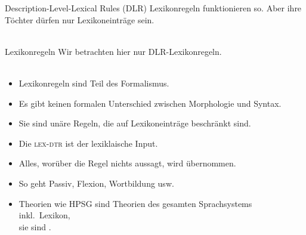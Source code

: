 \begin{frame}
  {Description-Level-Lexical Rules (DLR)}
  \onslide<+->
  \onslide<+->
  \alert{Lexikonregeln} funktionieren so. Aber \alert{ihre Töchter dürfen nur Lexikoneinträge sein}.\\
  \onslide<+->
  \Zeile
  \centering 
  \\
  \Halbzeile
  \onslide<+->
\end{frame}

\begin{frame}
  {Lexikonregeln}
  \onslide<+->
  \onslide<+->
  Wir betrachten hier nur DLR-Lexikonregeln.\\
  \\
  \Halbzeile
  \begin{itemize}[<+->]
    \item Lexikonregeln sind Teil des Formalismus.
    \item Es gibt keinen formalen Unterschied zwischen Morphologie und Syntax.
    \item Sie sind unäre Regeln, die auf Lexikoneinträge beschränkt sind.
    \item Die \textsc{lex-dtr} ist der lexiklaische Input.
    \item Alles, worüber die Regel nichts aussagt, wird übernommen.
      \Halbzeile
    \item So geht Passiv, Flexion, Wortbildung usw.
    \item Theorien wie HPSG sind \alert{Theorien des gesamten Sprachsystems} inkl.\ Lexikon,\\
      sie sind .
  \end{itemize}
\end{frame}

